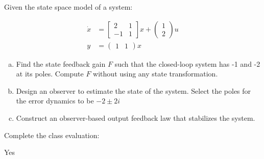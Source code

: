 \documentclass[11pt]{article}
\begin{document}
\soln











Given the state space model of a system:

\begin{align*}
    \dot{x} &= \begin{bmatrix}
        2 & 1 \\ -1 & 1
    \end{bmatrix} x + \begin{pmatrix}
        1 \\ 2
    \end{pmatrix} u \\
    y &= \begin{pmatrix}
        1 & 1
    \end{pmatrix} x
\end{align*}

\begin{enumerate}[a)]
    \item Find the state feedback gain $F$ such that the closed-loop system has -1 and -2 at its poles.
    Compute $F$ without using any state transformation.
    \item Design an observer to estimate the state of the system. Select the poles for the error dynamics to be $-2 \pm 2i$
    \item Construct an observer-based output feedback law that stabilizes the system.
\end{enumerate}
\soln








Complete the class evaluation:
\soln

Yes
\end{document}
